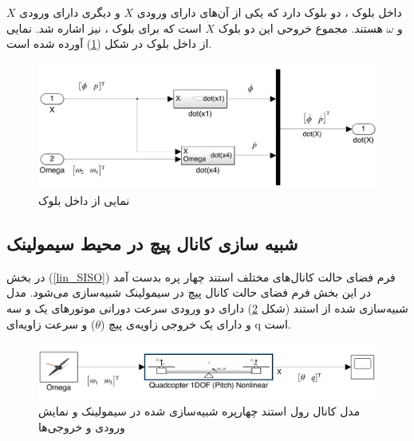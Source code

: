 داخل بلوک
،
دو بلوک دارد که یکی از آن‌های دارای ورودی $X$ و دیگری دارای ورودی $X$ و $\omega$ هستند. مجموع خروحی این دو بلوک $\dot X$ است که برای بلوک
،
نیز اشاره شد.
نمایی از داخل بلوک
در شکل (\ref{roll_all-six}) آورده شده است.
\begin{figure}[H]
	\includegraphics[width=16cm]{../../Figures/QuadSimulation/roll_all-six.png}
	\centering
	\caption{نمایی از داخل بلوک }
	\label{roll_all-six}
\end{figure}

\subsection{شبیه سازی کانال پیچ در محیط سیمولینک}
در بخش
(\ref{lin_SISO})
فرم فضای حالت کانال‌های مختلف استند چهار پره بدست آمد در این بخش فرم فضای حالت کانال پیچ در سیمولینک شبیه‌سازی می‌شود.
مدل شبیه‌سازی شده از استند (شکل \ref{pitch_simulink}) دارای دو ورودی سرعت دورانی موتورهای یک و سه  و دارای یک خروجی زاویه‌ی پیچ ($\theta$) و  سرعت زاویه‌ای q است.
\begin{figure}[H]
	\includegraphics[width=16cm]{../../Figures/QuadSimulation/pitch_Stand_Model.png}
	\centering
	\vspace*{-15mm}
	\caption{مدل کانال رول استند چهارپره شبیه‌سازی شده در سیمولینک و نمایش ورودی و خروجی‌ها}
	\label{pitch_simulink}
\end{figure}

